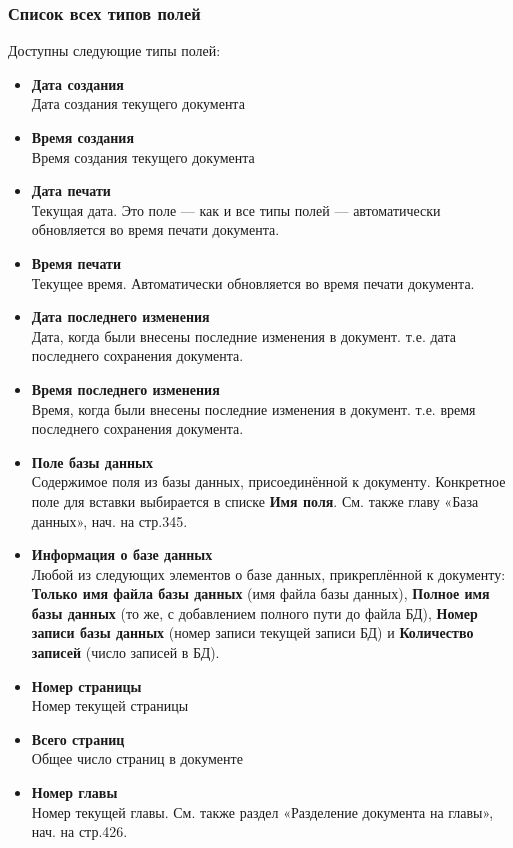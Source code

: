 \documentclass[a4paper,10pt]{article}
\begin{document}
\subsubsection{Список всех типов полей}
Доступны следующие типы полей:
\begin{itemize}
 \item \textbf{Дата создания}\\
 Дата создания текущего документа
 \item \textbf{Время создания}\\
 Время создания текущего документа
 \item \textbf{Дата печати}\\
 Текущая дата. Это поле --- как и все типы полей --- автоматически обновляется во время печати документа.
 \item \textbf{Время печати}\\
 Текущее время. Автоматически обновляется во время печати документа.
 \item \textbf{Дата последнего изменения}\\
 Дата, когда были внесены последние изменения в документ. т.е. дата последнего сохранения документа.
 \item \textbf{Время последнего изменения}\\
 Время, когда были внесены последние изменения в документ. т.е. время последнего сохранения документа.
 \item \textbf{Поле базы данных}\\
 Содержимое поля из базы данных, присоединённой к документу. Конкретное поле для вставки выбирается в списке \textbf{Имя поля}. См. также главу «База данных», нач. на стр.345.
 \item \textbf{Информация о базе данных}\\
 Любой из следующих элементов о базе данных, прикреплённой к документу: \textbf{Только имя файла базы данных} (имя файла базы данных), \textbf{Полное имя базы данных} (то же, с добавлением полного пути до файла БД), \textbf{Номер записи базы данных} (номер записи текущей записи БД) и \textbf{Количество записей} (число записей в БД).
 \item \textbf{Номер страницы}\\
 Номер текущей страницы
 \item \textbf{Всего страниц}\\
 Общее число страниц в документе
 \item \textbf{Номер главы}\\
 Номер текущей главы. См. также раздел «Разделение документа на главы», нач. на стр.426.

\end{itemize}
\end{document}
